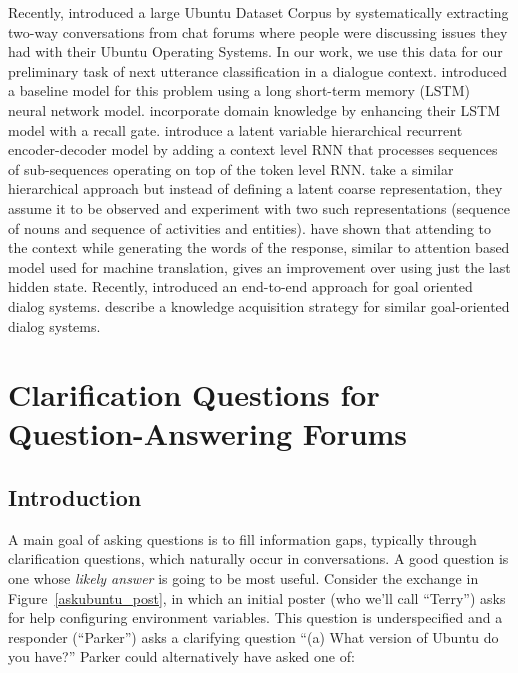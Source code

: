 \documentclass[11pt]{report}
\renewcommand\cite{\citep}	%
\begin{document}
Recently, \cite{lowe2015ubuntu} introduced a large Ubuntu Dataset Corpus by systematically extracting two-way conversations from chat forums where people were discussing issues they had with their Ubuntu Operating Systems. In our work, we use this data for our preliminary task of next utterance classification in a dialogue context. \cite{lowe2015ubuntu}  introduced a baseline model for this problem using a long short-term memory (LSTM) neural network model. \cite{xu2016incorporating} incorporate domain knowledge by enhancing their LSTM model with a recall gate. \cite{serban2016hierarchical} introduce a latent variable hierarchical recurrent encoder-decoder model by adding a context level RNN that processes sequences of sub-sequences operating on top of the token level RNN. \cite{serban2016multiresolution} take a similar hierarchical approach but instead of defining a latent coarse representation, they assume it to be observed and experiment with two such representations (sequence of nouns and sequence of activities and entities). \cite{yao2016attentional} have shown that attending to the context while generating the words of the response, similar to attention based model used for machine translation, gives an improvement over using just the last hidden state. Recently, \cite{bordes2016learning} introduced an end-to-end approach for goal oriented dialog systems. \cite{pappu2014knowledge} describe a knowledge acquisition strategy for similar goal-oriented dialog systems. 

\newpage

\chapter{Clarification Questions for Question-Answering Forums}\label{stackexchange}

\section{Introduction}\label{introduction}

A main goal of asking questions is to fill information gaps, typically through clarification questions, which naturally occur in conversations. 
A good question is one whose \emph{likely answer} is going to be most useful.
Consider the exchange in Figure~\ref{askubuntu_post}, in which an initial poster (who we'll call ``Terry'') asks for help configuring environment variables.
This question is underspecified and a responder (``Parker'') asks a clarifying question ``\textsf{\small (a) What version of Ubuntu do you have?}''
Parker could alternatively have asked one of:
\end{document}
